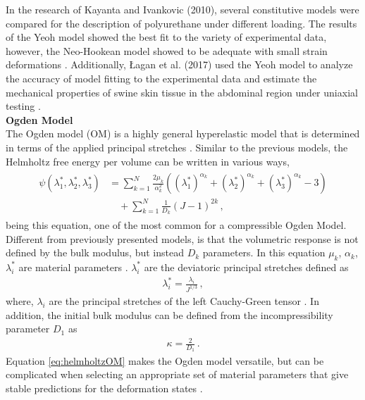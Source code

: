 In the research of Kayanta and Ivankovic (2010), several constitutive models were compared for the description 
of polyurethane under different loading. The results of the Yeoh model showed the best fit to the variety of experimental data, however, 
the Neo-Hookean model showed to be adequate with small strain deformations \cite{Kanyanta2010}.
Additionally, Łagan et al. (2017) used the Yeoh model to analyze the accuracy of model fitting 
to the experimental data and estimate the mechanical properties of swine skin tissue in the abdominal region under uniaxial testing \cite{Lagan2017}.\\

       
\textbf{Ogden Model}\\

The Ogden model (OM) is a highly general hyperelastic model that is determined in terms of the applied principal stretches \cite{Bergström2015}.
Similar to the previous models, the Helmholtz free energy per volume can be written in various ways, 
\begin{align}
        \begin{split}
        \psi(\lambda_1^*, \lambda_2^*, \lambda_3^*) &= \sum_{k=1}^N \frac{2\mu_k}{\alpha_k^2}((\lambda_1^*)^{\alpha_k} + (\lambda_2^*)^{\alpha_k} + (\lambda_3^*)^{\alpha_k} - 3) \\
        &\quad+ \sum_{k=1}^N \frac{1}{D_k}(J - 1)^{2k} \,,
        \end{split}
        \label{eq:helmholtzOM}
\end{align}
being this equation, one of the most common for a compressible Ogden Model. Different from previously presented models, is that 
the volumetric response is not defined by the bulk modulus, but instead $D_k$ parameters. In this equation
$\mu_k$, $\alpha_k$, $\lambda_i^*$ are material parameters \cite{Youssef2022}. $\lambda_i^*$ are the deviatoric principal stretches defined as
\begin{align}
        \lambda_i^* = \frac{\lambda_i}{J^{1/3}} \,,
\end{align}
where, $\lambda_i$ are the principal stretches of the left Cauchy-Green tensor \cite{Ansys2010}. In addition, the initial bulk modulus 
can be defined from the incompressibility parameter $D_1$ as 
\begin{align}
        \kappa = \frac{2}{D_1} \,.
\end{align}
Equation \ref{eq:helmholtzOM} makes the Ogden model versatile, but can be complicated when selecting an appropriate 
set of material parameters that give stable predictions for the deformation states \cite{Bergström2015}. 
